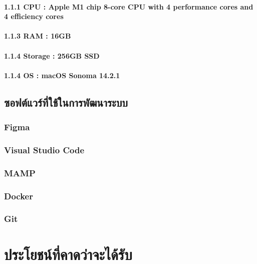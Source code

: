 \hspace{2.5cm}\hangindent=4.9cm\paragraph{1.1.1 CPU : Apple M1 chip 8-core CPU with 4 perform­ance cores and 4 efficiency cores}

\hspace{2.5cm}\hangindent=4.9cm\paragraph{1.1.3 RAM : 16GB}

\hspace{2.5cm}\hangindent=4.9cm\paragraph{1.1.4 Storage : 256GB SSD}

\hspace{2.5cm}\hangindent=4.9cm\paragraph{1.1.4 OS : macOS Sonoma 14.2.1 }


\hspace{0cm}\subsection{ซอฟต์แวร์ที่ใช้ในการพัฒนาระบบ}

\hspace{1cm}\subsubsection{Figma}

\hspace{1cm}\subsubsection{Visual Studio Code}

\hspace{1cm}\subsubsection{MAMP}

\hspace{1cm}\subsubsection{Docker}

\hspace{1cm}\subsubsection{Git}

\section{ประโยชน์ที่คาดว่าจะได้รับ}



